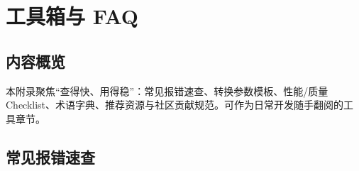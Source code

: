 \chapter{工具箱与 FAQ}\label{ux9644ux5f55-6ux5de5ux5177ux7bb1ux4e0e-faq}

\section{内容概览}\label{src-appendix-appendix6-h1}

本附录聚焦``查得快、用得稳''：常见报错速查、转换参数模板、性能/质量
Checklist、术语字典、推荐资源与社区贡献规范。可作为日常开发随手翻阅的工具章节。

\section{常见报错速查}\label{src-appendix-appendix6-h2}

